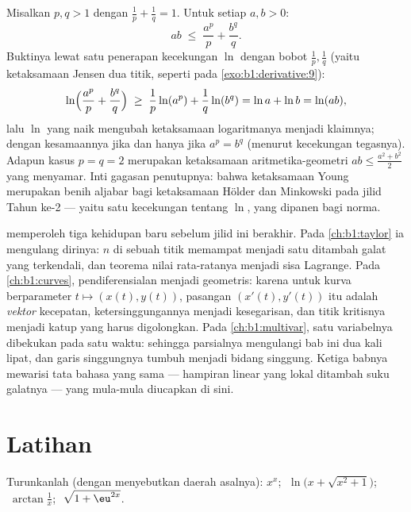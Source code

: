 \begin{example}\label{ex:b1:derivative:young}
Misalkan $p, q > 1$ dengan $\frac1p + \frac1q = 1$. Untuk setiap $a, b > 0$:
\[
ab \;\leq\; \frac{a^p}{p} + \frac{b^q}{q} .
\]
Buktinya lewat satu penerapan kecekungan $\ln$ dengan bobot
$\frac1p, \frac1q$ (yaitu ketaksamaan Jensen dua titik, seperti pada
\cref{exo:b1:derivative:9}):
\[
\ln\Bigl(\frac{a^p}{p} + \frac{b^q}{q}\Bigr)
\;\geq\; \frac1p \ln(a^p) + \frac1q \ln(b^q)
= \ln a + \ln b = \ln(ab),
\]
lalu $\ln$ yang naik mengubah ketaksamaan logaritmanya menjadi
klaimnya; dengan kesamaannya jika dan hanya jika $a^p = b^q$ (menurut kecekungan tegasnya). Adapun kasus
$p = q = 2$ merupakan ketaksamaan aritmetika-geometri $ab \leq
\frac{a^2 + b^2}{2}$ yang menyamar. Inti gagasan penutupnya: bahwa ketaksamaan
Young merupakan benih aljabar bagi ketaksamaan Hölder dan Minkowski
pada jilid Tahun ke-2 --- yaitu satu  kecekungan
tentang $\ln$, yang dipanen bagi norma.
\end{example}

\begin{remark}
 memperoleh tiga kehidupan baru sebelum jilid ini berakhir.
Pada \cref{ch:b1:taylor} ia mengulang dirinya: $n$  di sebuah titik
memampat menjadi satu  ditambah galat yang terkendali, dan
teorema nilai rata-ratanya menjadi sisa Lagrange. Pada
\cref{ch:b1:curves}, pendiferensialan menjadi geometris: karena untuk
kurva berparameter $t \mapsto (x(t), y(t))$, pasangan $(x'(t),
y'(t))$ itu adalah \emph{vektor} kecepatan, ketersinggungannya menjadi
kesegarisan, dan titik kritisnya menjadi katup yang harus digolongkan. Pada
\cref{ch:b1:multivar}, satu variabelnya dibekukan pada satu waktu: sehingga 
parsialnya mengulangi bab ini dua kali lipat, dan garis singgungnya
tumbuh menjadi bidang singgung. Ketiga babnya mewarisi tata bahasa
yang sama --- hampiran linear yang lokal ditambah suku galatnya ---
yang mula-mula diucapkan di sini.
\end{remark}

\section{Latihan}

\begin{exercise}[$\star$]\label{exo:b1:derivative:1}
Turunkanlah (dengan menyebutkan daerah asalnya): $x^x$;
$\;\ln\bigl(x + \sqrt{x^2+1}\bigr)$; $\;\arctan\frac{1}{x}$;
$\;\sqrt{1 + \eu^{2x}}$.
\end{exercise}

